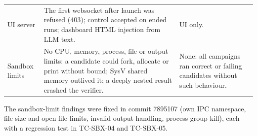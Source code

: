 \begin{scriptsize}
\begin{longtable}{@{}p{}p{}p{}@{}}
UI server & The first websocket after launch was refused (403); control accepted on ended runs; dashboard HTML injection from LLM text. & UI only. \\
Sandbox limits & No CPU, memory, process, file or output limits: a candidate could fork, allocate or print without bound; SysV shared memory outlived it; a deeply nested result crashed the verifier. & None: all campaigns ran correct or failing candidates without such behaviour. \\
\bottomrule
\end{longtable}
\end{scriptsize}

The sandbox-limit findings were fixed in commit 7895107 (own IPC namespace,
file-size and open-file limits, invalid-output handling, process-group kill),
each with a regression test in TC-SBX-04 and TC-SBX-05.
